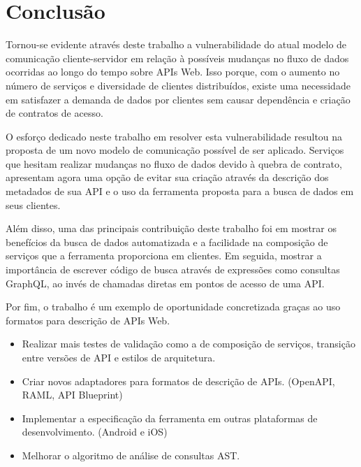 \chapter{Conclusão}

Tornou-se evidente através deste trabalho a vulnerabilidade do atual modelo de comunicação cliente-servidor em relação à possíveis mudanças no fluxo de dados ocorridas ao longo do tempo sobre APIs Web. Isso porque, com o aumento no número de serviços e diversidade de clientes distribuídos, existe uma necessidade em satisfazer a demanda de dados por clientes sem causar dependência e criação de contratos de acesso.

O esforço dedicado neste trabalho em resolver esta vulnerabilidade resultou na proposta de um novo modelo de comunicação possível de ser aplicado. Serviços que hesitam realizar mudanças no fluxo de dados devido à quebra de contrato, apresentam agora uma opção de evitar sua criação através da descrição dos metadados de sua API e o uso da ferramenta proposta para a busca de dados em seus clientes.

Além disso, uma das principais contribuição deste trabalho foi em mostrar os benefícios da busca de dados automatizada e a facilidade na composição de serviços que a ferramenta proporciona em clientes. Em seguida, mostrar a importância de escrever código de busca através de expressões como consultas GraphQL, ao invés de chamadas diretas em pontos de acesso de uma API.

Por fim, o trabalho é um exemplo de oportunidade concretizada graças ao uso formatos para descrição de APIs Web.



\begin{itemize}
\item Realizar mais testes de validação como a de composição de serviços, transição entre versões de API e estilos de arquitetura.
\item Criar novos adaptadores para formatos de descrição de APIs. (OpenAPI, RAML, API Blueprint)
\item Implementar a especificação da ferramenta em outras plataformas de desenvolvimento. (Android e iOS)
\item Melhorar o algoritmo de análise de consultas AST.
\end{itemize}
